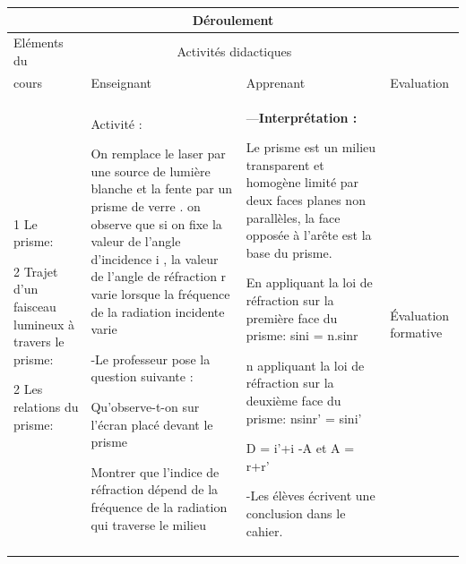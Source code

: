 \documentclass[12pt]{article}
\begin{document}
\begin{center}
	 \begin{tabular}{|p{}||p{}||p{}||p{}|}
\hline
\multicolumn{4}{|c|}{Déroulement}\\\hline
Eléments du & \multicolumn{2}{c||}{Activités didactiques} &  \\\cline{2-3}
cours & Enseignant & Apprenant & Evaluation\\\hline

\color{red}{III Dispersion de la lumière:}

\vspace{0.5cm}
\color{blue}1
Le prisme:

\vspace{0.5cm}
\color{blue}2 Trajet d’un faisceau lumineux à travers le prisme: 

\vspace{0.5cm}
\color{blue}2 	Les relations du prisme:	
	  &
Activité : 

On remplace le laser par une source de lumière blanche et la fente par un prisme de verre . on observe que si on
fixe la valeur de l’angle d’incidence i , la valeur de l’angle de réfraction r varie lorsque la fréquence de la radiation
incidente varie



\vspace{0.2cm}
-Le professeur pose la question suivante : 

Qu’observe-t-on sur l’écran placé devant le prisme

Montrer que l’indice de réfraction dépend de la fréquence de
la radiation qui traverse le milieu






				  &

---\textbf{Interprétation : }

Le prisme est un milieu transparent et homogène limité par deux faces planes non parallèles, la face opposée
à l’arête est la base du prisme.

\vspace{0.2cm}
En appliquant la loi de réfraction sur la première face du prisme: sini = n.sinr 

n appliquant la loi de réfraction sur la deuxième face du prisme: nsinr' = sini'

D = i'+i -A et A = r+r'


-Les élèves écrivent une conclusion dans le cahier.
\vspace{0.5cm}

				  & 
	Évaluation formative\\\hline 
\end{tabular}
\end{center}
\end{document}
